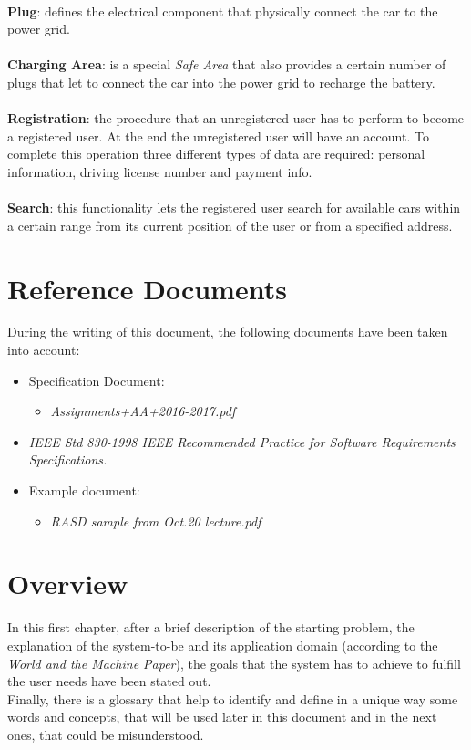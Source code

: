 \documentclass[11pt,a4paper]{report}
\begin{document}
\noindent \\
\textbf{Plug}: defines the electrical component that physically connect the car to the power grid.\\ 
\noindent \\
\textbf{Charging Area}: is a special \textit{Safe Area} that also provides a certain number of plugs that let to connect the car into the power grid to recharge the battery.\\
\noindent \\
\textbf{Registration}: the procedure that an unregistered user has to perform to become a registered user. At the end the unregistered user will have an account. To complete this operation three different types of data are required: personal information, driving license number and payment info.\\
\noindent \\
\textbf{Search}: this functionality lets the registered user search for available cars within a certain range from its current position of the user or from a specified address.

\section{Reference Documents}
During the writing of this document, the following documents have been taken into account:
	\begin{itemize}
		\item Specification Document:
		\begin{itemize}
			\item \textit{Assignments+AA+2016-2017.pdf}
		\end{itemize}
		\item \textit{IEEE Std 830-1998 IEEE Recommended Practice for Software Requirements Specifications.}
		\item Example document:
		\begin{itemize}
			\item \textit{RASD sample from Oct.20 lecture.pdf}
		\end{itemize}
	\end{itemize}
	
\section{Overview}
In this first chapter, after a brief description of the starting problem, the explanation of the system-to-be and its application domain (according to the \textit{World and the Machine Paper}), the goals that the system has to achieve to fulfill the user needs have been stated out.\\
Finally, there is a glossary that help to identify and define in a unique way some words and concepts, that will be used later in this document and in the next ones, that could be misunderstood.
\end{document}
